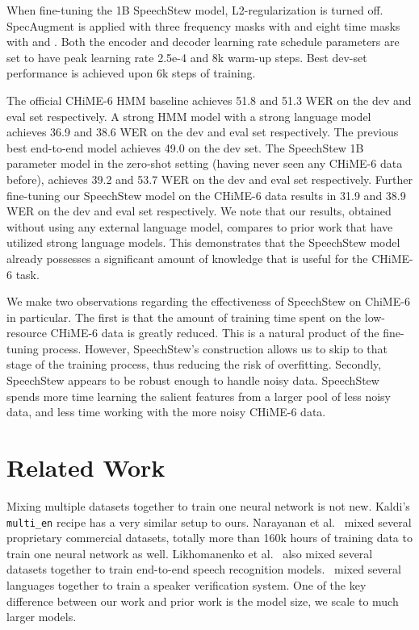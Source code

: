 \documentclass[a4paper]{article}
\begin{document}
When fine-tuning the 1B SpeechStew model, L2-regularization is turned off. SpecAugment is applied with three frequency masks with  and eight time masks with  and . Both the encoder and decoder learning rate schedule parameters are set to have peak learning rate 2.5e-4 and 8k warm-up steps. Best dev-set performance is achieved upon 6k steps of training.

The official CHiME-6 HMM baseline \cite{watanabe-arxiv-2020} achieves 51.8 and 51.3 WER on the dev and eval set respectively. A strong HMM model with a strong language model \cite{medennikov-chime-2020} achieves 36.9 and 38.6 WER on the dev and eval set respectively. The previous best end-to-end model \cite{andrusenko-arxiv-2020} achieves 49.0 on the dev set. The SpeechStew 1B parameter model in the zero-shot setting (having never seen any CHiME-6 data before), achieves 39.2 and 53.7 WER on the dev and eval set respectively. Further fine-tuning our SpeechStew model on the CHiME-6 data results in 31.9 and 38.9 WER on the dev and eval set respectively. We note that our results, obtained without using any external language model, compares to prior work that have utilized strong language models. This demonstrates that the SpeechStew model already possesses a significant amount of knowledge that is useful for the CHiME-6 task.

We make two observations regarding the effectiveness of SpeechStew on ChiME-6 in particular. The first is that the amount of training time spent on the low-resource CHiME-6 data is greatly reduced. This is a natural product of the fine-tuning process. However, SpeechStew's construction allows us to skip to that stage of the training process, thus reducing the risk of overfitting. Secondly, SpeechStew appears to be robust enough to handle noisy data. SpeechStew spends more time learning the salient features from a larger pool of less noisy data, and less time working with the more noisy CHiME-6 data.


\section{Related Work}
Mixing multiple datasets together to train one neural network is not new. Kaldi's \texttt{multi\_en} recipe \cite{kaldi-multi-en} has a very similar setup to ours. Narayanan et al.~\cite{narayanan-slt-2018} mixed several proprietary commercial datasets, totally more than 160k hours of training data to train one neural network as well. Likhomanenko et al.~\cite{likhomanenko-arxiv-2020} also mixed several datasets together to train end-to-end speech recognition models.~\cite{chojnacka-arxiv-2021} mixed several languages together to train a speaker verification system. One of the key difference between our work and prior work is the model size, we scale to much larger models.
\end{document}
